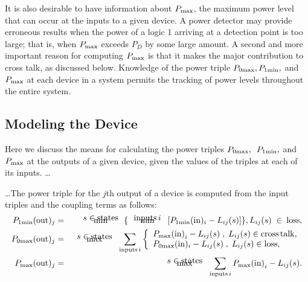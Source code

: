 It is also
desirable to have information about $ P_{\rm max} $, the maximum
    power level that can occur at the inputs to a given device.  A
power       detector may provide erroneous results when the power
of a logic 1    arriving at a detection point is too large;
that is, when $ P_{\rm max} $  exceeds $ P_D $  by some large
amount.  A second and more important reason       for computing $
P_{\rm max} $  is that it makes the major contribution to
cross talk, as discussed below.  Knowledge of the       power
triple $ P_{0\rm max}, P_{1\rm min}, $ and $ P_{\rm max} $
at each device in a system       permits the tracking of power
levels throughout the entire system.




\subsection{ Modeling the Device}
Here we discuss the means for calculating the power triples
$ P_{0\rm max},\kern.5em P_{1\rm min}, $ and $ P_{\rm max}$
  at the outputs of a given device, given the       values of the
triples at each of its inputs.  \ldots

\ldots The power triple for the $j$th output of a device is
computed       from the input triples and the coupling terms as
follows: \begin{eqnarray}                           P_{1\rm
min}({\rm out})_j & = & \begin{array}[t]{c}{\rm min} \\[-15pt]
{s\in\rm states} \end{array}\, \{ \,  \begin{array}[t]{c}{\rm min}
\\[-15pt] {\rm inputs}\, i \end{array} \;  [P_{1\rm min}({\rm in})_i
- L_{ij}(s)]\}, L_{ij}(s) \; \in \;  {\rm
loss},\label{p1min} \\ P_{0\rm max}({\rm out})_j & =&
\begin{array}[t]{c}{\rm max} \\[-15pt] {s\in\rm states}
\end{array}\, \sum_{{\rm inputs}\, i}\left\{
\begin{array}{l}P_{\rm max}{\rm (in)}_i - L_{ij}(s)\;  ,\;
L_{ij}(s)\in {\rm cross\, talk},\label{p0max} \\  P_{0\rm max}({\rm
in})_i - L_{ij}(s)\; ,\; L_{ij}(s)\in {\rm loss},   \end{array}
\right. \\ P_{\rm max}({\rm out})_j &=& \begin{array}[t]{c}{\rm
max} \\[-15pt] {s\in\rm states} \end{array}\, \sum_{{\rm inputs}\,
i}  P_{\rm max}{\rm (in)}_i - L_{ij}(s) . \label{pmax}
\end{eqnarray}

